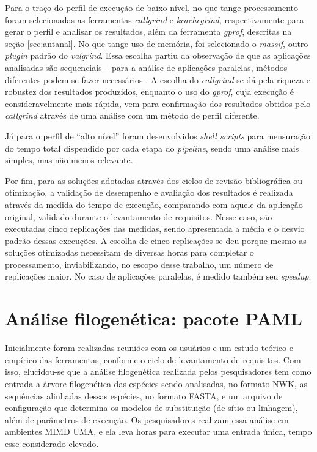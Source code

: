 \documentclass[cic,tc]{iiufrgs}
\begin{document}
Para o traço do perfil de execução de baixo nível, no que tange processamento
foram selecionadas as ferramentas \textit{callgrind} e \textit{kcachegrind}, respectivamente para
gerar o perfil e analisar os resultados, além da ferramenta \textit{gprof}, descritas na seção
\ref{sec:antanal}. No que tange uso de memória, foi selecionado o
\textit{massif}, outro \textit{plugin} padrão do \textit{valgrind}. Essa escolha partiu da
observação de que as aplicações analisadas são sequenciais -- para a análise de
aplicações paralelas, métodos diferentes podem se fazer necessários
\cite{weidendorfer2008sequential}. A escolha do \textit{callgrind} se dá pela riqueza e
robustez dos resultados produzidos, enquanto o uso do \textit{gprof}, cuja execução é
consideravelmente mais rápida, vem para confirmação dos resultados obtidos pelo
\textit{callgrind} através de uma análise com um método de perfil diferente.

Já para o perfil de ``alto nível'' foram desenvolvidos \textit{shell scripts}
para mensuração do tempo total dispendido por cada etapa do \textit{pipeline},
sendo uma análise mais simples, mas não menos relevante.

Por fim, para as soluções adotadas através dos ciclos de revisão bibliográfica
ou otimização, a validação de desempenho e avaliação dos resultados é realizada
através da medida do tempo de execução, comparando com aquele da aplicação
original, validado durante o levantamento de requisitos. Nesse caso, são
executadas cinco replicações das medidas, sendo apresentada a média e o desvio
padrão dessas execuções. A escolha de cinco replicações se deu porque mesmo as
soluções otimizadas necessitam de diversas horas para completar o
processamento, inviabilizando, no escopo desse trabalho, um número de
replicações maior. No caso de aplicações paralelas, é medido também seu
\textit{speedup}. 

\section{Análise filogenética: pacote PAML}
\label{sec:filomp}

Inicialmente foram realizadas reuniões com os usuários e um estudo teórico e
empírico das ferramentas, conforme o ciclo de levantamento de requisitos. Com
isso, elucidou-se que a análise filogenética realizada pelos pesquisadores tem
como entrada a árvore filogenética das espécies sendo analisadas, no formato
NWK, as sequências alinhadas dessas espécies, no formato FASTA, e um arquivo de
configuração que determina os modelos de substituição (de sítio ou linhagem),
além de parâmetros de execução. Os pesquisadores realizam essa análise em
ambientes MIMD UMA, e ela leva horas para executar uma entrada única,
tempo esse considerado elevado.
\end{document}

